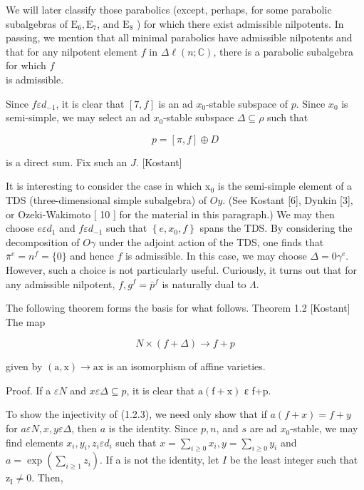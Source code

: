 \documentclass[10pt]{article}
\begin{document}
We will later classify those parabolics (except, perhaps, for some parabolic subalgebras of $\mathrm{E}_{6}, \mathrm{E}_{7}$, and $\mathrm{E}_{8}$ ) for which there exist admissible nilpotents. In passing, we mention that all minimal parabolics have admissible nilpotents and that for any nilpotent element $f$ in $\Delta \ell(n ; \mathbb{C})$, there is a parabolic subalgebra for which $f$\\
is admissible.

Since $f \varepsilon d_{-1}$, it is clear that $[7, f]$ is an ad $x_{0}$-stable subspace of $p$. Since $x_{0}$ is semi-simple, we may select an ad $x_{0}$-stable subspace $\Delta \subseteq \rho$ such that


\begin{equation*}
p=[\pi, f] \oplus D \tag{1.2.2}
\end{equation*}


is a direct sum. Fix such an $J$. [Kostant]

It is interesting to consider the case in which $\mathrm{x}_{0}$ is the semi-simple element of a TDS (three-dimensional simple subalgebra) of $O y$. (See Kostant [6], Dynkin [3], or Ozeki-Wakimoto [ 10 ] for the material in this paragraph.) We may then choose $e \varepsilon d_{1}$ and $f \varepsilon d_{-1}$ such that $\left\{e, x_{0}, f\right\}$ spans the TDS. By considering the decomposition of $O \gamma$ under the adjoint action of the TDS, one finds that $\bar{\pi}^{e}=n^{f}=\{0\}$ and hence $f$ is admissible. In this case, we may choose $\Delta=0 \gamma^{e}$. However, such a choice is not particularly useful. Curiously, it turns out that for any admissible nilpotent, $f, g^{f}=\bar{p}^{f}$ is naturally dual to $\Lambda$.

The following theorem forms the basis for what follows. Theorem 1.2 [Kostant] The map


\begin{equation*}
N \times(f+\Delta) \rightarrow f+p \tag{1.2.3}
\end{equation*}


given by $(\mathrm{a}, \mathrm{x}) \rightarrow \mathrm{ax}$ is an isomorphism of affine varieties.

Proof. If a $\varepsilon N$ and $x \varepsilon \Delta \subseteq p$, it is clear that $\mathrm{a}(\mathrm{f}+\mathrm{x})$ ɛ f+p.

To show the injectivity of (1.2.3), we need only show that if $a(f+x)=f+y$ for $a \varepsilon N, x, y \varepsilon \Delta$, then $a$ is the identity. Since $p, n$, and $s$ are ad $x_{0}$-stable, we may find elements $x_{i}, y_{i}, z_{i} \varepsilon d_{i}$ such that $x=\sum_{i \geq 0} x_{i}, y=\sum_{i \geq 0} y_{i}$ and $a=\exp \left(\sum_{i \geq 1} z_{i}\right)$. If a is not the identity, let $I$ be the least integer such that $\mathrm{z}_{\mathrm{I}} \neq 0$. Then,
\end{document}
